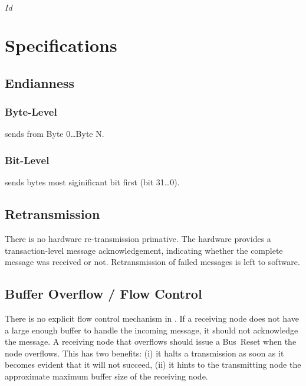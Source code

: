 \svnInfo $Id$

\section{Specifications}

\subsection{Endianness}

\subsubsection{Byte-Level}
\bus sends from Byte 0{\ldots}Byte N.

\subsubsection{Bit-Level}
\bus sends bytes most siginificant bit first (bit 31{\ldots}0).

\subsection{Retransmission}
There is no hardware re-transmission primative. The hardware provides a
transaction-level message acknowledgement, indicating whether the complete
message was received or not. Retransmission of failed messages is left to
software.

\subsection{Buffer Overflow / Flow Control}
There is no explicit flow control mechanism in \bus. If a receiving node does
not have a large enough buffer to handle the incoming message, it should not
acknowledge the message. A receiving node that overflows should issue a
Bus~Reset when the node overflows. This has two benefits: (i) it halts a
transmission as soon as it becomes evident that it will not succeed, (ii) it
hints to the transmitting node the approximate maximum buffer size of the
receiving node.
